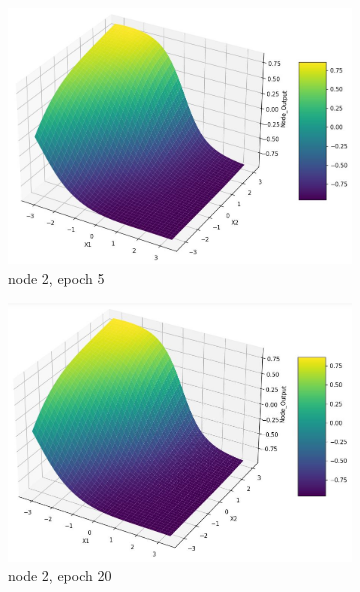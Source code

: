 \documentclass[11pt]{article}
\begin{document}
\begin{figure}[h!]
\begin{subfigure}[b]{0.3\textwidth}
	\includegraphics[scale=0.14]{hidden2_n2_e5.jpg}
	\caption{node 2, epoch 5}
	\label{fig:fig2.1.6.7}
	\end{subfigure}
	\begin{subfigure}[b]{0.3\textwidth}
	\centering
	\includegraphics[scale=0.14]{hidden2_n2_e20.jpg}
	\caption{node 2, epoch 20}
	\label{fig:fig2.1.6.8}
	\end{subfigure}
	\begin{subfigure}[b]{0.45\textwidth}
	\centering

\end{subfigure}
\end{figure}
\end{document}

